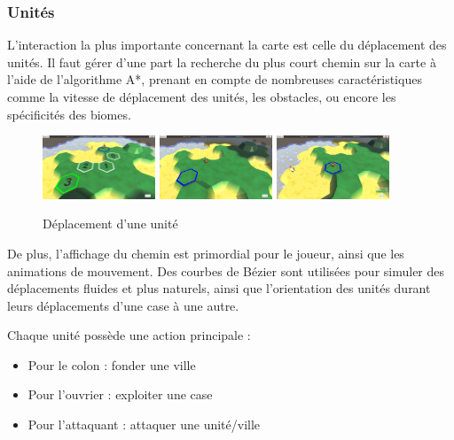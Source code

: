 \documentclass[12pt]{report}
\begin{document}
\subsubsection{Unités}

L’interaction la plus importante concernant la carte est celle du déplacement
des unités. Il faut gérer d’une part la recherche du plus court chemin sur la
carte à l’aide de l’algorithme A*, prenant en compte de nombreuses
caractéristiques comme la vitesse de déplacement des unités, les obstacles, ou
encore les spécificités des biomes.

\begin{figure}[H]
    \centering
    \includegraphics[width=0.3\textwidth]{pathfinding1}
    \includegraphics[width=0.3\textwidth]{pathfinding2}
    \includegraphics[width=0.3\textwidth]{pathfinding3}
    \caption*{Déplacement d'une unité}
\end{figure}

De plus, l’affichage du chemin est primordial pour le joueur, ainsi que les
animations de mouvement. Des courbes de Bézier sont utilisées pour simuler des
déplacements fluides et plus naturels, ainsi que l’orientation des unités durant
leurs déplacements d’une case à une autre.

Chaque unité possède une action principale :

\begin{itemize}
    \item Pour le colon : fonder une ville
    \item Pour l’ouvrier : exploiter une case
    \item Pour l’attaquant : attaquer une unité/ville
\end{itemize}
\end{document}
